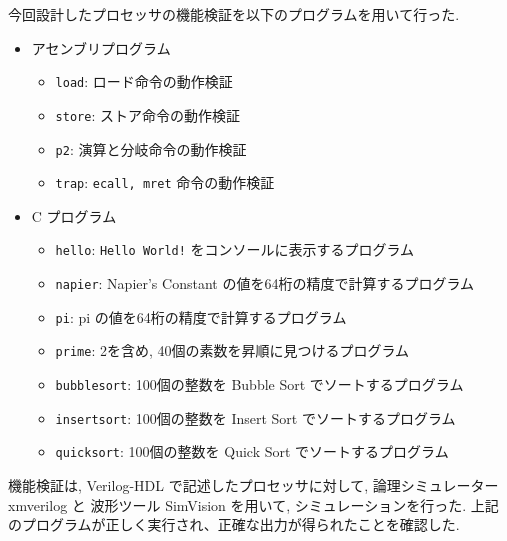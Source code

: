 \documentclass[../main.tex]{subfiles}
\begin{document}
  今回設計したプロセッサの機能検証を以下のプログラムを用いて行った.

  \begin{itemize}
    \item アセンブリプログラム
    \begin{itemize}
      \item \verb|load|: ロード命令の動作検証
      \item \verb|store|: ストア命令の動作検証
      \item \verb|p2|: 演算と分岐命令の動作検証
      \item \verb|trap|: \verb|ecall, mret| 命令の動作検証
    \end{itemize}

    \item C プログラム
    \begin{itemize}
      \item \verb|hello|: \verb|Hello World!| をコンソールに表示するプログラム
      \item \verb|napier|: Napier's Constant の値を64桁の精度で計算するプログラム
      \item \verb|pi|: pi の値を64桁の精度で計算するプログラム
      \item \verb|prime|: 2を含め, 40個の素数を昇順に見つけるプログラム
      \item \verb|bubblesort|: 100個の整数を Bubble Sort でソートするプログラム
      \item \verb|insertsort|: 100個の整数を Insert Sort でソートするプログラム
      \item \verb|quicksort|: 100個の整数を Quick Sort でソートするプログラム
    \end{itemize}
  \end{itemize}

  機能検証は, Verilog-HDL で記述したプロセッサに対して, 
  論理シミュレーター xmverilog と
  波形ツール SimVision を用いて, シミュレーションを行った.
  上記のプログラムが正しく実行され、正確な出力が得られたことを確認した.
\end{document}
